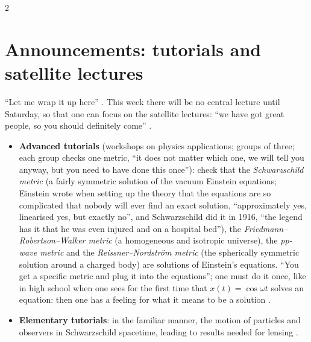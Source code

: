 \begin{paracol}{2}
\section{Announcements: tutorials and satellite lectures}\label{sec:c15-announce}

``Let me wrap it up here'' . This week there will be no central lecture until Saturday, so that one can focus on the satellite lectures: ``we have got great people, so you should definitely come'' .
\begin{itemize}
  \item \textbf{Advanced tutorials} (workshops on physics applications; groups of three; each group checks one metric, ``it does not matter which one, we will tell you anyway, but you need to have done this once''): check that the \emph{Schwarzschild metric} (a fairly symmetric solution of the vacuum Einstein equations; Einstein wrote when setting up the theory that the equations are so complicated that nobody will ever find an exact solution, ``approximately yes, linearised yes, but exactly no'', and Schwarzschild did it in 1916, ``the legend has it that he was even injured and on a hospital bed''), the \emph{Friedmann--Robertson--Walker metric} (a homogeneous and isotropic universe), the \emph{pp-wave metric} and the \emph{Reissner--Nordstr\"om metric} (the spherically symmetric solution around a charged body) are solutions of Einstein's equations. ``You get a specific metric and plug it into the equations''; one must do it once, like in high school when one sees for the first time that $x(t)=\cos\omega t$ solves an equation: then one has a feeling for what it means to be a solution .
  \item \textbf{Elementary tutorials}: in the familiar manner, the motion of particles and observers in Schwarzschild spacetime, leading to results needed for lensing .

\end{itemize}
\end{paracol}
